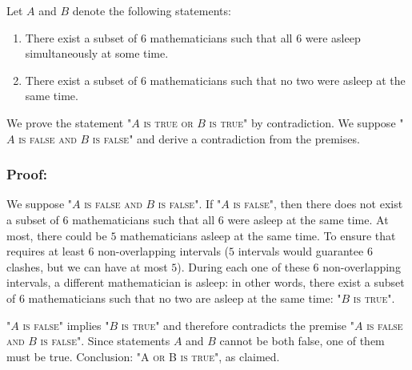 

Let $A$ and $B$ denote the following statements:
\begin{enumerate}[label=\Alph*]
\item \quad There exist a subset of $6$ mathematicians such that all $6$ were asleep simultaneously at some time. 
\item \quad There exist a subset of $6$ mathematicians such that no two were asleep at the same time.
\end{enumerate}

We prove the statement "\textsc{$A$ is true or $B$ is true}" by contradiction. We suppose "\textsc{$A$ is false and $B$ is false}" and derive a contradiction from the premises. 

\subsubsection*{Proof:}
We suppose "\textsc{$A$ is false and $B$ is false}". If "\textsc{$A$ is false}", then there does not exist a subset of $6$ mathematicians such that all $6$ were asleep at the same time. At most, there could be $5$ mathematicians asleep at the same time. To ensure that requires at least $6$ non-overlapping intervals ($5$ intervals would guarantee $6$ clashes, but we can have at most $5$). During each one of these $6$ non-overlapping intervals, a different mathematician is asleep: in other words, there exist a subset of $6$ mathematicians such that no two are asleep at the same time: "\textsc{$B$ is true}". 

"\textsc{$A$ is false}" implies "\textsc{$B$ is true}" and therefore contradicts the premise "\textsc{$A$ is false and $B$ is false}". Since  statements $A$ and $B$ cannot be both false, one of them must be true. Conclusion: "\textsc{A or B is true}", as claimed. 
